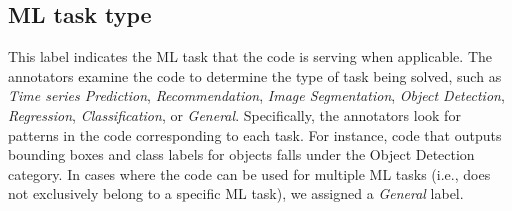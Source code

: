     


\subsection{ML task type}
    
This label indicates the ML task\cite{sarker2021machine, Vinodkumar2023Survey, technologies2024Manakitsa} that the code is serving when applicable. The annotators examine the code to determine the type of task being solved, such as \textit{Time series Prediction}, \textit{Recommendation}, \textit{Image Segmentation}, \textit{Object Detection}, \textit{Regression}, \textit{Classification}, or \textit{General}. Specifically, the annotators look for patterns in the code corresponding to each task. For instance, code that outputs bounding boxes and class labels for objects falls under the Object Detection category. In cases where the code can be used for multiple ML tasks (i.e., does not exclusively belong to a specific ML task), we assigned a \textit{General} label.

